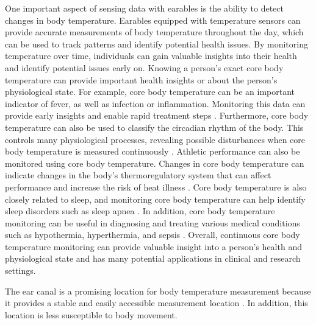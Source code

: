 One important aspect of sensing data with earables is the ability to detect changes in body temperature. 
Earables equipped with temperature sensors can provide accurate measurements of body temperature throughout the day, which can be used to track patterns and identify potential health issues. 
By monitoring temperature over time, individuals can gain valuable insights into their health and identify potential issues early on.
Knowing a person's exact core body temperature can provide important health insights or about the person's physiological state.
For example, core body temperature can be an important indicator of fever, as well as infection or inflammation. Monitoring this data can provide early insights and enable rapid treatment steps \cite{NovelWearableDevice2021}.
Furthermore, core body temperature can also be used to classify the circadian rhythm of the body. This controls many physiological processes, revealing possible disturbances when core body temperature is measured continuously \cite{liCircadianRhythmAnalysis2021, juSleepQualityPreclinical2013}.
Athletic performance can also be monitored using core body temperature. Changes in core body temperature can indicate changes in the body's thermoregulatory system that can affect performance and increase the risk of heat illness \cite{gabbettAthleteMonitoringCycle2017, silvaSleepQualityTraining2022}.
Core body temperature is also closely related to sleep, and monitoring core body temperature can help identify sleep disorders such as sleep apnea \cite{PIIS0022399902, liuSleepSuicideSystematic2020}.
In addition, core body temperature monitoring can be useful in diagnosing and treating various medical conditions such as hypothermia, hyperthermia, and sepsis \cite{hardingTemperatureDependenceSleep2019, Doi101016, raymannSkinDeepEnhanced2008}.
Overall, continuous core body temperature monitoring can provide valuable insight into a person's health and physiological state and has many potential applications in clinical and research settings.

The ear canal is a promising location for body temperature measurement because it provides a stable and easily accessible measurement location \cite{ericksonComparisonEarbasedBladder1993}.
In addition, this location is less susceptible to body movement. 

